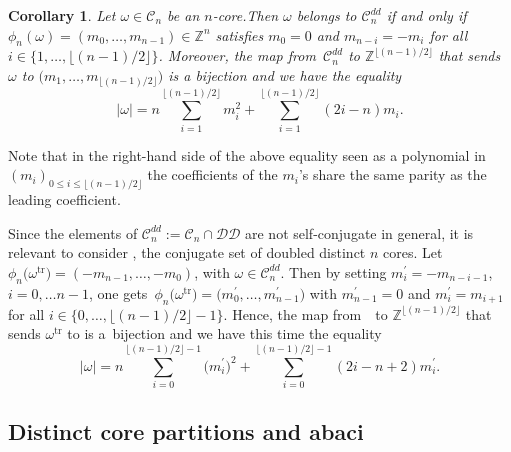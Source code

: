 \documentclass[10pt,a4paper]{amsart}
\newtheorem{Corollary}[Theorem]{Corollary}
\numberwithin{equation}{section}
\newcommand{\cC}{\mathcal{C}}
\def\ccdd{\mathcal {DD}}
\newcommand{\Z}{\mathbb{Z}}
\begin{document}
\begin{Corollary}
	\label{cor:gkdd}Let $\omega \in \cC_{n}$ be an $n$-core.Then $\omega $
	belongs to $\cC_{n}^{dd}$ if and only if $\phi _{n}(\omega )=(m_{0},\dots
	,m_{n-1})\in \Z^{n}$ satisfies $m_{0}=0$ and $m_{n-i}=-m_{i}$ for all $i\in
	\{1,\dots ,\lfloor (n-1)/2\rfloor \}$. Moreover, the map from~$\cC_{n}^{dd}$
	to $\Z^{\lfloor (n-1)/2\rfloor }$ that sends $\omega $ to $\bigl(m_{1},\dots
	,m_{\lfloor (n-1)/2\rfloor }\bigr)$ is a bijection and we have the equality
	\begin{equation}
	\lvert \omega \rvert =n\sum_{i=1}^{\lfloor (n-1)/2\rfloor
	}m_{i}^{2}+\sum_{i=1}^{\lfloor (n-1)/2\rfloor }(2i-n)m_{i}. \label{eq:gkdd}
	\end{equation}
\end{Corollary}

Note that in the right-hand side of the above equality seen as a polynomial in $(m_i)_{0\leq i \leq \lfloor (n-1)/2\rfloor }$
 the coefficients of the $m_{i}$'s share the same parity as the leading coefficient.

Since the elements of $\cC_{n}^{dd}:=\cC_{n}\cap \ccdd$ are not
self-conjugate in general, it is relevant to consider \smash{$\cC_{n}^{dd,\mathrm{tr}}=\bigl(\cC_{n}^{dd}\bigr) ^{\mathrm{tr}}$}, the conjugate set of doubled distinct $%
n $ cores. Let~${\phi _{n}\bigl(\omega ^{\mathrm{tr}}\bigr)=(-m_{n-1},\dots ,-m_{0})}$,
with $\omega \in \cC_{n}^{dd}$. Then by setting $m_{i}^{\prime
}=-m_{n-i-1}$, $i=0,\dots n-1$, one gets~${\phi _{n}\bigl(\omega ^{\mathrm{tr}%
}\bigr)\!=\bigl(m_{0}^{\prime },\dots ,m_{n-1}^{\prime }\bigr)}$ with $m_{n-1}^{\prime }=0$
and $m_{i}^{\prime }=m_{i+1}$ for all $i\in \{0,\dots ,\lfloor
(n-1)/2\rfloor -1\}$. Hence, the map from~\smash{$\cC_{n}^{dd,\mathrm{tr}}$}~to $
\Z^{\lfloor (n-1)/2\rfloor }$ that sends $\omega ^{\mathrm{tr}}$ to  is a~bijection and
we have this time the equality
\begin{equation*}
\lvert \omega \rvert =n\sum_{i=0}^{\lfloor (n-1)/2\rfloor -1}\bigl(m_{i}^{\prime
}\bigr)^{2}+\sum_{i=0}^{\lfloor (n-1)/2\rfloor -1}(2i-n+2)m_{i}^{\prime }.
\end{equation*}



\subsection{Distinct core partitions and abaci}
\end{document}
